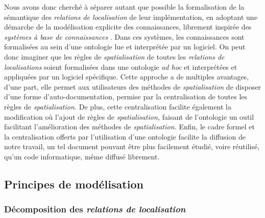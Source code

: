 Nous avons donc cherché à séparer autant que possible la formalisation
de la sémantique des \emph{relations de localisation} de leur
implémentation, en adoptant une démarche de la modélisation explicite
des connaissances, librement inspirée des \emph{systèmes à base de
  connaissances} . Dans ces
systèmes, les connaissances sont formalisées au sein d'une ontologie
lue et interprétée par un logiciel. On peut donc imaginer que les
règles de \emph{spatialisation} de toutes les \emph{relations de
  localisations} soient formalisées dans une ontologie \emph{ad hoc}
et interprétées et appliquées par un logiciel spécifique. Cette
approche a de multiples avantages, d'une part, elle permet aux
utilisateurs des méthodes de \emph{spatialisation} de disposer d'une
forme d'auto-documentation, permise par la centralisation de toutes
les règles de \emph{spatialisation.} De plus, cette centralisation
facilite également la modification où l'ajout de règles de
\emph{spatialisation,} faisant de l'ontologie un outil facilitant
l'amélioration des méthodes de \emph{spatialisation.} Enfin, le cadre
formel et la centralisation offerts par l’utilisation d'une ontologie
facilite la diffusion de notre travail, un tel document pouvant être
plus facilement étudié, voire réutilisé, qu'un code informatique, même
diffusé librement.

\subsection{Principes de modélisation}

\subsubsection{Décomposition des \emph{relations de localisation}}


